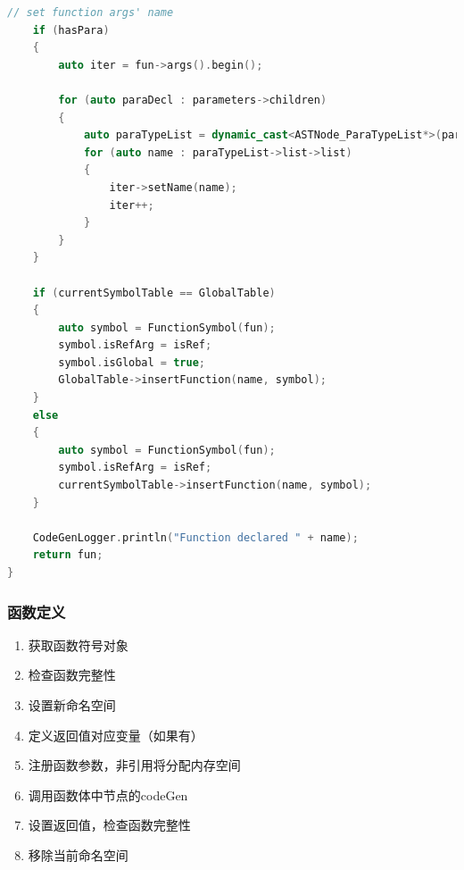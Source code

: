 \documentclass{article}
\begin{document}
\begin{lstlisting}[language=C++]
    // set function args' name
    if (hasPara)
    {
        auto iter = fun->args().begin();

        for (auto paraDecl : parameters->children)
        {
            auto paraTypeList = dynamic_cast<ASTNode_ParaTypeList*>(paraDecl);
            for (auto name : paraTypeList->list->list)
            {
                iter->setName(name);
                iter++;
            }
        }
    }

    if (currentSymbolTable == GlobalTable)
    {
        auto symbol = FunctionSymbol(fun);
        symbol.isRefArg = isRef;
        symbol.isGlobal = true;
        GlobalTable->insertFunction(name, symbol);
    }
    else
    {
        auto symbol = FunctionSymbol(fun);
        symbol.isRefArg = isRef;
        currentSymbolTable->insertFunction(name, symbol);
    }

    CodeGenLogger.println("Function declared " + name);
    return fun;
}
\end{lstlisting}

\subsubsection{函数定义}
\begin{enumerate}
  \item 获取函数符号对象
  \item 检查函数完整性
  \item 设置新命名空间
  \item 定义返回值对应变量（如果有）
  \item 注册函数参数，非引用将分配内存空间
  \item 调用函数体中节点的codeGen
  \item 设置返回值，检查函数完整性
  \item 移除当前命名空间
\end{enumerate}
\end{document}
